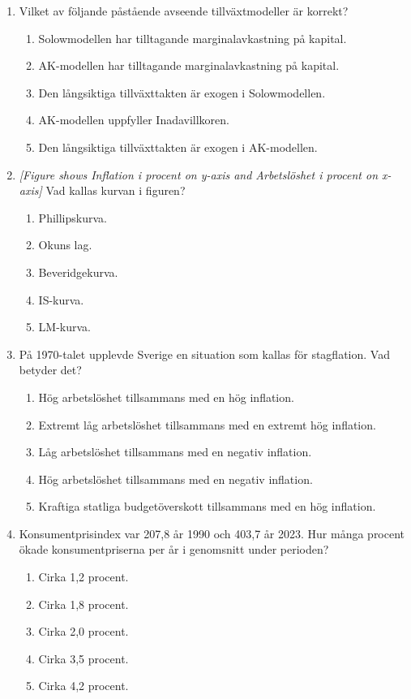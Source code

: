 \documentclass[12pt,a4paper]{article}
\begin{document}
\begin{enumerate}[label=\arabic*.]
    \item Vilket av följande påstående avseende tillväxtmodeller är korrekt?
    \begin{enumerate}[label=\Alph*.]
        \item Solowmodellen har tilltagande marginalavkastning på kapital.
        \item AK-modellen har tilltagande marginalavkastning på kapital.
        \item Den långsiktiga tillväxttakten är exogen i Solowmodellen.
        \item AK-modellen uppfyller Inadavillkoren.
        \item Den långsiktiga tillväxttakten är exogen i AK-modellen.
    \end{enumerate}

    \item \textit{[Figure shows Inflation i procent on y-axis and Arbetslöshet i procent on x-axis]} Vad kallas kurvan i figuren?
    \begin{enumerate}[label=\Alph*.]
        \item Phillipskurva.
        \item Okuns lag.
        \item Beveridgekurva.
        \item IS-kurva.
        \item LM-kurva.
    \end{enumerate}

    \item På 1970-talet upplevde Sverige en situation som kallas för stagflation. Vad betyder det?
    \begin{enumerate}[label=\Alph*.]
        \item Hög arbetslöshet tillsammans med en hög inflation.
        \item Extremt låg arbetslöshet tillsammans med en extremt hög inflation.
        \item Låg arbetslöshet tillsammans med en negativ inflation.
        \item Hög arbetslöshet tillsammans med en negativ inflation.
        \item Kraftiga statliga budgetöverskott tillsammans med en hög inflation.
    \end{enumerate}

    \item Konsumentprisindex var 207,8 år 1990 och 403,7 år 2023. Hur många procent ökade konsumentpriserna per år i genomsnitt under perioden?
    \begin{enumerate}[label=\Alph*.]
        \item Cirka 1,2 procent.
        \item Cirka 1,8 procent.
        \item Cirka 2,0 procent.
        \item Cirka 3,5 procent.
        \item Cirka 4,2 procent.
    \end{enumerate}


\end{enumerate}
\end{document}
